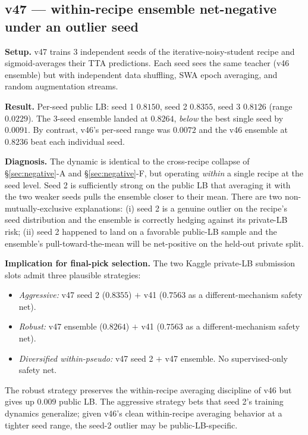 \documentclass[conference]{IEEEtran}
\begin{document}
\subsection{v47 --- within-recipe ensemble net-negative under an outlier seed}

\textbf{Setup.} v47 trains 3 independent seeds of the iterative-noisy-student recipe and sigmoid-averages their TTA predictions. Each seed sees the same teacher (v46 ensemble) but with independent data shuffling, SWA epoch averaging, and random augmentation streams.

\textbf{Result.} Per-seed public LB: seed 1 $0.8150$, seed 2 $\mathbf{0.8355}$, seed 3 $0.8126$ (range $0.0229$). The 3-seed ensemble landed at $0.8264$, \emph{below} the best single seed by $0.0091$. By contrast, v46's per-seed range was $0.0072$ and the v46 ensemble at $0.8236$ beat each individual seed.

\textbf{Diagnosis.} The dynamic is identical to the cross-recipe collapse of \S\ref{sec:negative}-A and \S\ref{sec:negative}-F, but operating \emph{within} a single recipe at the seed level. Seed 2 is sufficiently strong on the public LB that averaging it with the two weaker seeds pulls the ensemble closer to their mean. There are two non-mutually-exclusive explanations: (i) seed 2 is a genuine outlier on the recipe's seed distribution and the ensemble is correctly hedging against its private-LB risk; (ii) seed 2 happened to land on a favorable public-LB sample and the ensemble's pull-toward-the-mean will be net-positive on the held-out private split.

\textbf{Implication for final-pick selection.} The two Kaggle private-LB submission slots admit three plausible strategies:
\begin{itemize}
  \item \emph{Aggressive:} v47 seed 2 ($0.8355$) $+$ v41 ($0.7563$ as a different-mechanism safety net).
  \item \emph{Robust:} v47 ensemble ($0.8264$) $+$ v41 ($0.7563$ as a different-mechanism safety net).
  \item \emph{Diversified within-pseudo:} v47 seed 2 $+$ v47 ensemble. No supervised-only safety net.
\end{itemize}
The robust strategy preserves the within-recipe averaging discipline of v46 but gives up $0.009$ public LB. The aggressive strategy bets that seed 2's training dynamics generalize; given v46's clean within-recipe averaging behavior at a tighter seed range, the seed-2 outlier may be public-LB-specific.
\end{document}
